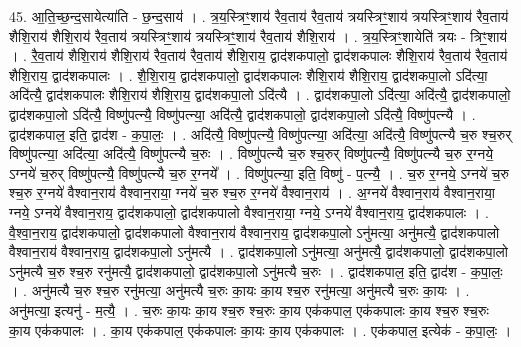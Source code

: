 \documentclass[17pt]{extarticle}
\begin{document}
45. आ॒ति॒च्छ॒न्द॒सायेत्या॑ति - छ॒न्द॒साय॑ । . त्र॒य॒स्त्रिꣳ॒॒शाय॑ रैव॒ताय॑ रैव॒ताय॑ त्रयस्त्रिꣳ॒॒शाय॑ त्रयस्त्रिꣳ॒॒शाय॑ रैव॒ताय॑ शैशि॒राय॑ शैशि॒राय॑ रैव॒ताय॑ त्रयस्त्रिꣳ॒॒शाय॑ त्रयस्त्रिꣳ॒॒शाय॑ रैव॒ताय॑ शैशि॒राय॑ । . त्र॒य॒स्त्रिꣳ॒॒शायेति॑ त्रयः - त्रिꣳ॒॒शाय॑ । . रै॒व॒ताय॑ शैशि॒राय॑ शैशि॒राय॑ रैव॒ताय॑ रैव॒ताय॑ शैशि॒राय॒ द्वाद॑शकपालो॒ द्वाद॑शकपालः शैशि॒राय॑ रैव॒ताय॑ रैव॒ताय॑ शैशि॒राय॒ द्वाद॑शकपालः । . शै॒शि॒राय॒ द्वाद॑शकपालो॒ द्वाद॑शकपालः शैशि॒राय॑ शैशि॒राय॒ द्वाद॑शकपा॒लो ऽदि॑त्या॒ अदि॑त्यै॒ द्वाद॑शकपालः शैशि॒राय॑ शैशि॒राय॒ द्वाद॑शकपा॒लो ऽदि॑त्यै । . द्वाद॑शकपा॒लो ऽदि॑त्या॒ अदि॑त्यै॒ द्वाद॑शकपालो॒ द्वाद॑शकपा॒लो ऽदि॑त्यै॒ विष्णु॑पत्न्यै॒ विष्णु॑पत्न्या॒ अदि॑त्यै॒ द्वाद॑शकपालो॒ द्वाद॑शकपा॒लो ऽदि॑त्यै॒ विष्णु॑पत्न्यै । . द्वाद॑शकपाल॒ इति॒ द्वाद॑श - क॒पा॒लः॒ । . अदि॑त्यै॒ विष्णु॑पत्न्यै॒ विष्णु॑पत्न्या॒ अदि॑त्या॒ अदि॑त्यै॒ विष्णु॑पत्न्यै च॒रु श्च॒रुर् विष्णु॑पत्न्या॒ अदि॑त्या॒ अदि॑त्यै॒ विष्णु॑पत्न्यै च॒रुः । . विष्णु॑पत्न्यै च॒रु श्च॒रुर् विष्णु॑पत्न्यै॒ विष्णु॑पत्न्यै च॒रु र॒ग्नये॒ ऽग्नये॑ च॒रुर् विष्णु॑पत्न्यै॒ विष्णु॑पत्न्यै च॒रु र॒ग्नये᳚ । . विष्णु॑पत्न्या॒ इति॒ विष्णु॑ - प॒त्न्यै॒ । . च॒रु र॒ग्नये॒ ऽग्नये॑ च॒रु श्च॒रु र॒ग्नये॑ वैश्वान॒राय॑ वैश्वान॒राया॒ ग्नये॑ च॒रु श्च॒रु र॒ग्नये॑ वैश्वान॒राय॑ । . अ॒ग्नये॑ वैश्वान॒राय॑ वैश्वान॒राया॒ ग्नये॒ ऽग्नये॑ वैश्वान॒राय॒ द्वाद॑शकपालो॒ द्वाद॑शकपालो वैश्वान॒राया॒ ग्नये॒ ऽग्नये॑ वैश्वान॒राय॒ द्वाद॑शकपालः । . वै॒श्वा॒न॒राय॒ द्वाद॑शकपालो॒ द्वाद॑शकपालो वैश्वान॒राय॑ वैश्वान॒राय॒ द्वाद॑शकपा॒लो ऽनु॑मत्या॒ अनु॑मत्यै॒ द्वाद॑शकपालो वैश्वान॒राय॑ वैश्वान॒राय॒ द्वाद॑शकपा॒लो ऽनु॑मत्यै । . द्वाद॑शकपा॒लो ऽनु॑मत्या॒ अनु॑मत्यै॒ द्वाद॑शकपालो॒ द्वाद॑शकपा॒लो ऽनु॑मत्यै च॒रु श्च॒रु रनु॑मत्यै॒ द्वाद॑शकपालो॒ द्वाद॑शकपा॒लो ऽनु॑मत्यै च॒रुः । . द्वाद॑शकपाल॒ इति॒ द्वाद॑श - क॒पा॒लः॒ । . अनु॑मत्यै च॒रु श्च॒रु रनु॑मत्या॒ अनु॑मत्यै च॒रुः का॒यः का॒य श्च॒रु रनु॑मत्या॒ अनु॑मत्यै च॒रुः का॒यः । . अनु॑मत्या॒ इत्यनु॑ - म॒त्यै॒ । . च॒रुः का॒यः का॒य श्च॒रु श्च॒रुः का॒य एक॑कपाल॒ एक॑कपालः का॒य श्च॒रु श्च॒रुः का॒य एक॑कपालः । . का॒य एक॑कपाल॒ एक॑कपालः का॒यः का॒य एक॑कपालः । . एक॑कपाल॒ इत्येक॑ - क॒पा॒लः॒ । \newline
\pagebreak
{}
\end{document}
